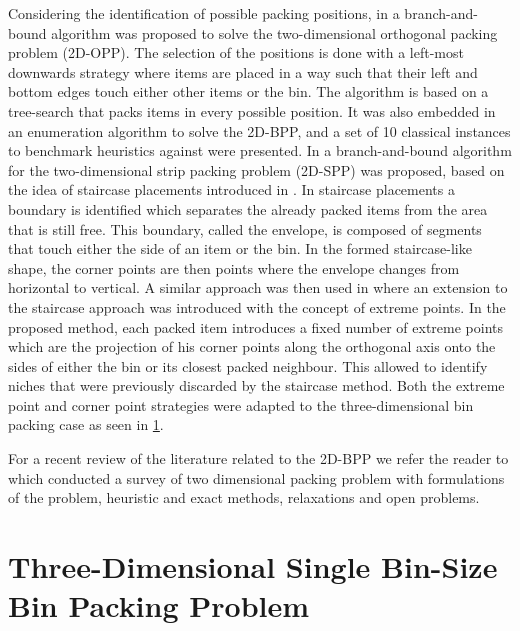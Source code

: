 Considering the identification of possible packing positions, in \cite{Martello1998} a branch-and-bound algorithm was proposed to solve the two-dimensional orthogonal packing problem (2D-OPP).
The selection of the positions is done with a left-most downwards strategy where items are placed in a way such that their left and bottom edges touch either other items or the bin.
The algorithm is based on a tree-search that packs items in every possible position.
It was also embedded in an enumeration algorithm to solve the 2D-BPP, and a set of 10 classical instances to benchmark heuristics against were presented.
In \cite{martello2003exact} a branch-and-bound algorithm for the two-dimensional strip packing problem (2D-SPP) was proposed, based on the idea of staircase placements introduced in \cite{scheithauer1995equivalence}.
In staircase placements a boundary is identified which separates the already packed items from the area that is still free.
This boundary, called the envelope, is composed of segments that touch either the side of an item or the bin.
In the formed staircase-like shape, the corner points are then points where the envelope changes from horizontal to vertical.
A similar approach was then used in \cite{crainic2008extreme} where an extension to the staircase approach was introduced with the concept of extreme points.
In the proposed method, each packed item introduces a fixed number of extreme points which are the projection of his corner points along the orthogonal axis onto the sides of either the bin or its closest packed neighbour.
This allowed to identify niches that were previously discarded by the staircase method.
Both the extreme point and corner point strategies were adapted to the three-dimensional bin packing case as seen in \cref{sec:literature:3dbpp}.

For a recent review of the literature related to the 2D-BPP we refer the reader to \cite{IORI2021399} which conducted a survey of two dimensional packing problem with formulations of the problem, heuristic and exact methods, relaxations and open problems.

\section{Three-Dimensional Single Bin-Size Bin Packing Problem}
\label{sec:literature:3dbpp}%

